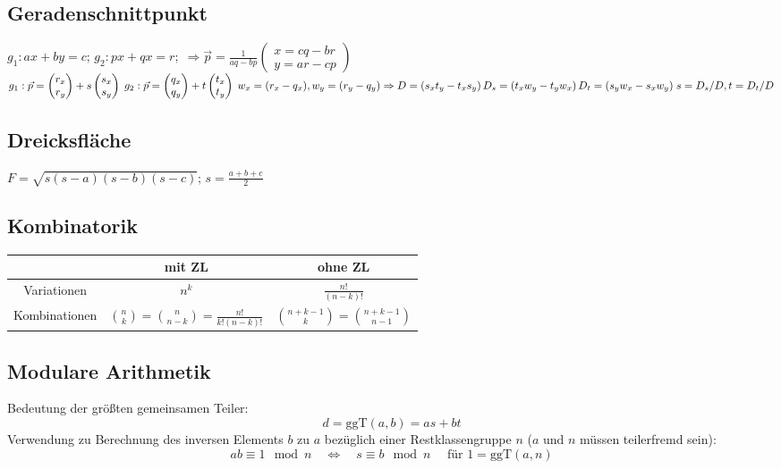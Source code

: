 \documentclass[10pt,a4paper,ngerman,oneside,
]{article}
\begin{document}
\subsection{Geradenschnittpunkt}
$g_1: ax+by=c;\,g_2: px+qx=r;\;\Rightarrow \vec{p}=\frac{1}{aq-bp}\begin{pmatrix}
x = cq-br\\y=ar-cp
\end{pmatrix}$\\
$
g_1: \vec{p}=\begin{pmatrix}r_x\\r_y\end{pmatrix}+ s \begin{pmatrix}s_x\\s_y\end{pmatrix}\;
g_2: \vec{p}=\begin{pmatrix}q_x\\q_y\end{pmatrix}+ t \begin{pmatrix}t_x\\t_y\end{pmatrix}\; w_x=(r_x-q_x),  w_y=(r_y-q_y)\\
\Rightarrow D=(s_xt_y-t_xs_y)\, D_s=(t_xw_y-t_yw_x)\,D_t=(s_yw_x-s_xw_y)\; s=D_s/D, t=D_t/D$
\subsection{Dreicksfläche}
$F=\sqrt{s(s-a)(s-b)(s-c)};\,s=\frac{a+b+c}{2}$
\subsection{Kombinatorik}
\begin{tabular}{|c||c|c|}\hline
 & mit ZL & ohne ZL\\\hline\hline
Variationen & $n^k$ & $\frac{n!}{(n-k)!}$\\\hline
Kombinationen & $\binom{n}{k}=\binom{n}{n-k}=\frac{n!}{k!(n-k)!}$ & $\binom{n+k-1}{k}=\binom{n+k-1}{n-1}$\\\hline
\end{tabular}

\subsection{Modulare Arithmetik}
Bedeutung der größten gemeinsamen Teiler:
\[ d = \text{ggT}(a,b) = as+bt \]
Verwendung zu Berechnung des inversen Elements $b$ zu $a$ bezüglich einer Restklassengruppe $n$ ($a$ und $n$ müssen teilerfremd sein):
\[ ab\equiv 1 \mod n\quad\Leftrightarrow\quad s\equiv b \mod n\quad\text{ für }1=\text{ggT}(a,n)\]
\end{document}
